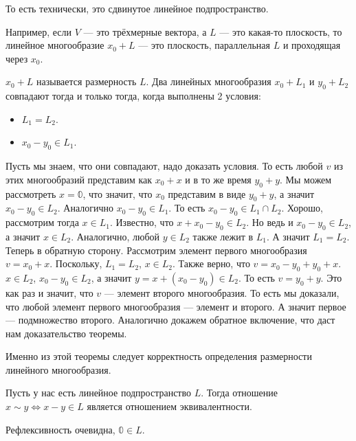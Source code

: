 \documentclass{article}
\begin{document}
\begin{itemize}
\begin{Comment}
            То есть технически, это сдвинутое линейное подпространство.
        \end{Comment}
        \begin{Example}
            Например, если $V$ --- это трёхмерные вектора, а $L$ --- это какая-то плоскость, то линейное многообразие $x_0+L$ --- это плоскость, параллельная $L$ и проходящая через $x_0$.
        \end{Example}
        \dfn {} $x_0+L$ называется размерность $L$.
        \thm Два линейных многообразия $x_0+L_1$ и $y_0+L_2$ совпадают тогда и только тогда, когда выполнены 2 условия:
        \begin{itemize}
            \item $L_1=L_2$.
            \item $x_0-y_0\in L_1$.
        \end{itemize}
        \begin{Proof}
            Пусть мы знаем, что они совпадают, надо доказать условия. То есть любой $v$ из этих многообразий представим как $x_0+x$ и в то же время $y_0+y$. Мы можем рассмотреть $x=\mathbb0$, что значит, что $x_0$ представим в виде $y_0+y$, а значит $x_0-y_0\in L_2$. Аналогично $x_0-y_0\in L_1$. То есть $x_0-y_0\in L_1\cap L_2$. Хорошо, рассмотрим тогда $x\in L_1$. Известно, что $x+x_0-y_0\in L_2$. Но ведь и $x_0-y_0\in L_2$, а значит $x\in L_2$. Аналогично, любой $y\in L_2$ также лежит в $L_1$. А значит $L_1=L_2$.\\
            Теперь в обратную сторону. Рассмотрим элемент первого многообразия $v=x_0+x$. Поскольку, $L_1=L_2$, $x\in L_2$. Также верно, что $v=x_0-y_0+y_0+x$. $x\in L_2$, $x_0-y_0\in L_2$, а значит $y=x+(x_0-y_0)\in L_2$. То есть $v=y_0+y$. Это как раз и значит, что $v$ --- элемент второго многообразия. То есть мы доказали, что любой элемент первого многообразия --- элемент и второго. А значит первое --- подмножество второго. Аналогично докажем обратное включение, что даст нам доказательство теоремы.
        \end{Proof}
        \begin{Comment}
            Именно из этой теоремы следует корректность определения размерности линейного многообразия.
        \end{Comment}
        \thm Пусть у нас есть линейное подпространство $L$. Тогда отношение $x\sim y\Leftrightarrow x-y\in L$ является отношением эквивалентности.
        \begin{Proof}
            Рефлексивность очевидна, $\mathbb0\in L$.\\

\end{Proof}
\end{itemize}
\end{document}

